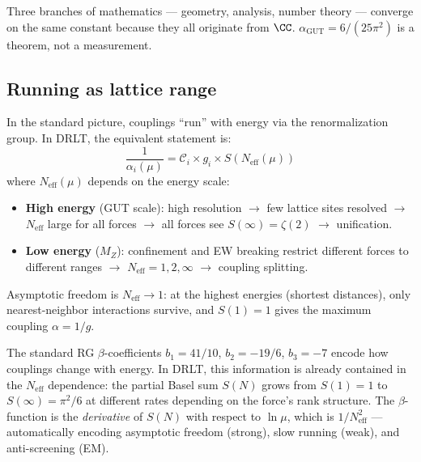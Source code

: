 Three branches of mathematics --- geometry, analysis, number theory --- converge on the same constant because they all originate from $\CC$. $\alpha_\text{GUT} = 6/(25\pi^2)$ is a theorem, not a measurement.

\subsection{Running as lattice range}

In the standard picture, couplings ``run'' with energy via the renormalization group. In DRLT, the equivalent statement is:
\begin{equation}
\frac{1}{\alpha_i(\mu)} = \mathcal{C}_i \times g_i \times S\!\left(N_\text{eff}(\mu)\right)
\end{equation}
where $N_\text{eff}(\mu)$ depends on the energy scale:

\begin{itemize}
\item \textbf{High energy} (GUT scale): high resolution $\to$ few lattice sites resolved $\to$ $N_\text{eff}$ large for all forces $\to$ all forces see $S(\infty) = \zeta(2)$ $\to$ unification.
\item \textbf{Low energy} ($M_Z$): confinement and EW breaking restrict different forces to different ranges $\to$ $N_\text{eff} = 1, 2, \infty$ $\to$ coupling splitting.
\end{itemize}

Asymptotic freedom is $N_\text{eff} \to 1$: at the highest energies (shortest distances), only nearest-neighbor interactions survive, and $S(1) = 1$ gives the maximum coupling $\alpha = 1/g$.

\begin{remark}
The standard RG $\beta$-coefficients $b_1 = 41/10$, $b_2 = -19/6$, $b_3 = -7$ encode how couplings change with energy. In DRLT, this information is already contained in the $N_\text{eff}$ dependence: the partial Basel sum $S(N)$ grows from $S(1) = 1$ to $S(\infty) = \pi^2/6$ at different rates depending on the force's rank structure. The $\beta$-function is the \emph{derivative} of $S(N)$ with respect to $\ln\mu$, which is $1/N_\text{eff}^2$ --- automatically encoding asymptotic freedom (strong), slow running (weak), and anti-screening (EM).
\end{remark}

